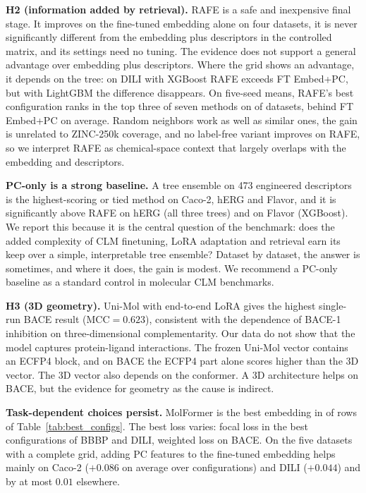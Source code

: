 \documentclass[pdflatex,sn-basic]{sn-jnl}%
\begin{document}
\textbf{H2 (information added by retrieval).} RAFE is a safe and inexpensive final stage. It improves on the fine-tuned embedding alone on four datasets, it is never significantly different from the embedding plus descriptors in the controlled matrix, and its settings need no tuning. The evidence does not support a general advantage over embedding plus descriptors. Where the grid shows an advantage, it depends on the tree: on DILI with XGBoost RAFE exceeds FT Embed+PC, but with LightGBM the difference disappears. On five-seed means, RAFE's best configuration ranks in the top three of seven methods on \ntop{} of \nds{} datasets, behind FT Embed+PC on average. Random neighbors work as well as similar ones, the gain is unrelated to ZINC-250k coverage, and no label-free variant improves on RAFE, so we interpret RAFE as chemical-space context that largely overlaps with the embedding and descriptors.

\textbf{PC-only is a strong baseline.} A tree ensemble on 473 engineered descriptors is the highest-scoring or tied method on Caco-2, hERG and Flavor, and it is significantly above RAFE on hERG (all three trees) and on Flavor (XGBoost). We report this because it is the central question of the benchmark: does the added complexity of CLM finetuning, LoRA adaptation and retrieval earn its keep over a simple, interpretable tree ensemble? Dataset by dataset, the answer is sometimes, and where it does, the gain is modest. We recommend a PC-only baseline as a standard control in molecular CLM benchmarks.

\textbf{H3 (3D geometry).} Uni-Mol with end-to-end LoRA gives the highest single-run BACE result (MCC$=0.623$), consistent with the dependence of BACE-1 inhibition on three-dimensional complementarity. Our data do not show that the model captures protein-ligand interactions. The frozen Uni-Mol vector contains an ECFP4 block, and on BACE the ECFP4 part alone scores higher than the 3D vector. The 3D vector also depends on the conformer. A 3D architecture helps on BACE, but the evidence for geometry as the cause is indirect.

\textbf{Task-dependent choices persist.} MolFormer is the best embedding in \nmf{} of \nrows{} rows of Table~\ref{tab:best_configs}. The best loss varies: focal loss in the best configurations of BBBP and DILI, weighted loss on BACE. On the five datasets with a complete grid, adding PC features to the fine-tuned embedding helps mainly on Caco-2 ($+0.086$ on average over configurations) and DILI ($+0.044$) and by at most $0.01$ elsewhere.
\end{document}

